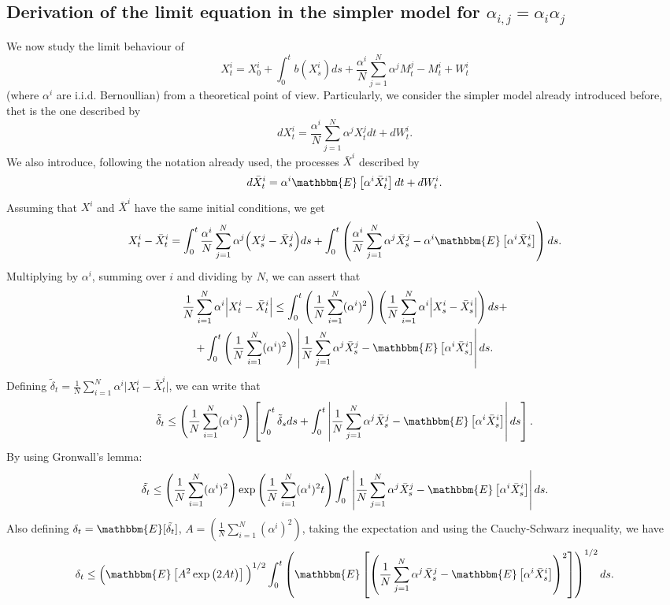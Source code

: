 \documentclass[11pt, a4paper]{article}
\begin{document}
\subsection{Derivation of the limit equation in the simpler model for $\alpha_{i,j}=\alpha_i\alpha_j$}
We now study the limit behaviour of \[ X^i_t = X^i_0 + \int_0^t b(X^i_s) ds + \frac{\alpha^i}{N} \sum_{j = 1}^N \alpha^j M^j_t - M^i_t + W^i_t \] (where $\alpha^i$ are i.i.d. Bernoullian) from a theoretical point of view. Particularly, we consider the simpler model already introduced before, thet is the one described by \[ d X^i_t = \frac{\alpha^i}{N} \sum_{j = 1}^N \alpha^j X^j_t dt + d W^i_t. \]
We also introduce, following the notation already used, the processes $\bar{X}^i$ described by \[ d \bar{X}^i_t = \alpha^i \mathbbm{E} \left[ \alpha^i \bar{X}^i_t \right] dt + d W^i_t. \]
Assuming that $X^i$ and $\bar{X}^i$ have the same initial conditions, we get \[ X^i_t - \bar{X}^i_t = \int_0^t \frac{\alpha^i}{N} \sum_{j = 1}^N \alpha^j \Big( X^j_s - \bar{X}^j_s \Big) ds + \int_0^t \left( \frac{\alpha^i}{N} \sum_{j = 1}^N \alpha^j \bar{X}^j_s - \alpha^i \mathbbm{E} \left[ \alpha^i \bar{X}^i_s \right] \right) ds. \]
Multiplying by $\alpha^i$, summing over $i$ and dividing by $N$, we can assert that \begin{multline*} \frac{1}{N} \sum_{i = 1}^N \alpha^i \Big| X^i_t - \bar{X}^i_t \Big| \leq \int_0^t \left( \frac{1}{N} \sum_{i = 1}^N (\alpha^i)^2 \right) \left( \frac{1}{N} \sum_{i = 1}^N \alpha^i \Big| X^i_s - \bar{X}^i_s \Big| \right) ds + \\ + \int_0^t \left( \frac{1}{N} \sum_{i = 1}^N (\alpha^i)^2 \right) \left| \frac{1}{N} \sum_{j = 1}^N \alpha^j \bar{X}^j_s - \mathbbm{E} \left[ \alpha^i \bar{X}^i_s \right] \right| ds. \end{multline*}
Defining $\tilde{\delta}_t = \frac{1}{N} \sum_{i = 1}^N \alpha^i \big| X^i_t - \bar{X}^i_t \big|$, we can write that \[ \tilde{\delta}_t \leq \left( \frac{1}{N} \sum_{i = 1}^N (\alpha^i)^2 \right) \left[ \int_0^t \tilde{\delta}_s ds + \int_0^t \left| \frac{1}{N} \sum_{j = 1}^N \alpha^j \bar{X}^j_s - \mathbbm{E} \left[ \alpha^i \bar{X}^i_s \right] \right| ds \right]. \]
By using Gronwall's lemma: \[ \tilde{\delta_t} \leq \left( \frac{1}{N} \sum_{i = 1}^N (\alpha^i)^2 \right) \exp \left( \frac{1}{N} \sum_{i = 1}^N (\alpha^i)^2 t \right) \int_0^t \left| \frac{1}{N} \sum_{j = 1}^N \alpha^j \bar{X}^j_s - \mathbbm{E} \left[ \alpha^i \bar{X}^i_s \right] \right| ds. \]
Also defining $\delta_t = \mathbbm{E}[\tilde{\delta_t}]$, $A = \left( \frac{1}{N} \sum_{i = 1}^N (\alpha^i)^2 \right)$, taking the expectation and using the Cauchy-Schwarz inequality, we have \[ \delta_t \leq \Big( \mathbbm{E} \left[ A^2 \exp \big( 2 A t \big) \right] \Big)^{1/2} \int_0^t \left( \mathbbm{E} \left[ \left( \frac{1}{N} \sum_{j = 1}^N \alpha^j \bar{X}^j_s - \mathbbm{E} \left[ \alpha^i \bar{X}^i_s \right] \right)^2 \right] \right)^{1/2} ds. \]
\end{document}
